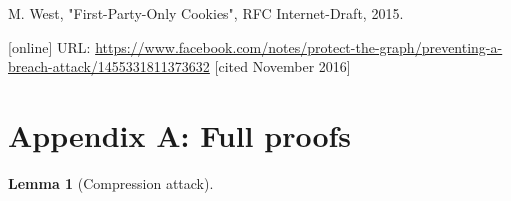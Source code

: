 \documentclass[conference, letterpaper, 10pt]{IEEEtran}
\newtheorem{lemma}{Lemma}
\begin{document}
\begin{thebibliography}{13}
 M. West, "First-Party-Only Cookies", RFC Internet-Draft, 2015.

 [online] URL:
\url{https://www.facebook.com/notes/protect-the-graph/preventing-a-breach-attack/1455331811373632}
[cited November 2016]





\end{thebibliography}

\section{Appendix A: Full proofs}

\begin{lemma}[Compression attack]
\end{lemma}
\end{document}
